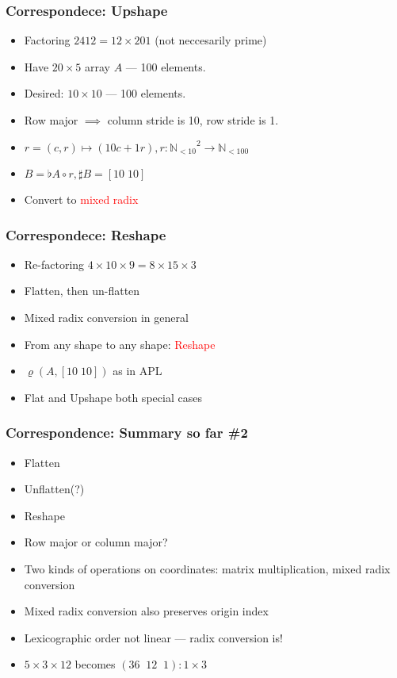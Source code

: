 \documentclass[xetex,mathserif,serif]{beamer}
\newcommand\Nat{\mathbb{N}}
\newcommand\NB[1]{\textcolor{red}{#1}}
\begin{document}
\begin{frame}
  \frametitle{Correspondece: Upshape} 
  \begin{itemize}%
    \item Factoring \(2412 = 12 \times 201\) (not neccesarily prime)
    \item Have \(20\times 5\) array \(A\) --- 100 elements.
    \item Desired: \(10 \times 10\) --- 100 elements.
    \item Row major \(\implies\) column stride is 10, row stride is 1.
    \item \(r = (c, r)\mapsto (10c + 1r), r : {\Nat_{<10}}^2 \to \Nat_{<100}\)
    \item \(B = \flat A \circ r, \sharp B = [10\;10]\)
    \item Convert to \NB{mixed radix}
  \end{itemize}
\end{frame}


\begin{frame}
  \frametitle{Correspondece: Reshape}
  \begin{itemize}%
    \item Re-factoring \(4\times 10 \times 9 = 8 \times 15 \times 3\)
    \item Flatten, then un-flatten
    \item Mixed radix conversion in general
    \item From any shape to any shape: \NB{Reshape}
    \item \(\varrho(A, [10\;10])\) as in APL
    \item Flat and Upshape both special cases
  \end{itemize}
\end{frame}

\begin{frame}
  \frametitle{Correspondence: Summary so far \#2}
  \begin{itemize}%
    \item Flatten
    \item Unflatten(?)
    \item Reshape
    \item Row major or column major?
    \item Two kinds of operations on coordinates: matrix multiplication, mixed radix conversion
    \item Mixed radix conversion also preserves origin index
    \item Lexicographic order not linear --- radix conversion is!
    \item \(5\times3\times12\) becomes \((36\;\;12\;\;1) : 1 \times 3\)
  \end{itemize}
\end{frame}
\end{document}
